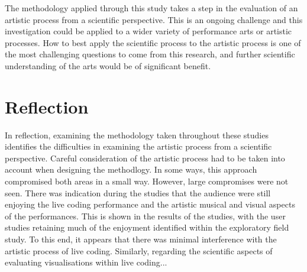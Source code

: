 The methodology applied through this study takes a step in the evaluation of an artistic process from a scientific perspective. This is an ongoing challenge and this investigation could be applied to a wider variety of performance arts or artistic processes. How to best apply the scientific process to the artistic process is one of the most challenging questions to come from this research, and further scientific understanding of the arts would be of significant benefit.

\section{Reflection}

In reflection, examining the methodology taken throughout these studies identifies the difficulties in examining the artistic process from a scientific perspective. Careful consideration of the artistic process had to be taken into account when designing the methodlogy. In some ways, this approach compromised both areas in a small way. However, large compromises were not seen. There was indication during the studies that the audience were still enjoying the live coding performance and the artistic musical and visual aspects of the performances. This is shown in the results of the studies, with the user studies retaining much of the enjoyment identified within the exploratory field study. To this end, it appears that there was minimal interference with the artistic process of live coding. Similarly, regarding the scientific aspects of evaluating visualisations within live coding...\more



